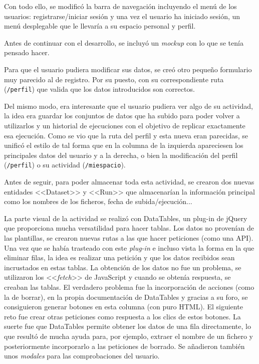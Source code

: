 Con todo ello, se modificó la barra de navegación incluyendo el menú de los
usuarios: registrarse/iniciar sesión y una vez el usuario ha iniciado sesión, un
menú desplegable que le llevaría a su espacio personal y perfil.

Antes de continuar con el desarrollo, se incluyó un \textit{mockup} con lo que
se tenía pensado hacer.

Para que el usuario pudiera modificar sus datos, se creó otro pequeño formulario
muy parecido al de registro. Por su puesto, con su correspondiente ruta
(\texttt{/perfil}) que valida que los datos introducidos son correctos.

Del mismo modo, era interesante que el usuario pudiera ver algo de su
actividad, la idea era guardar los conjuntos de datos que ha subido para poder
volver a utilizarlos y un historial de ejecuciones con el objetivo de replicar
exactamente esa ejecución. Como se vio que la ruta del perfil y esta nueva eran
parecidas, se unificó el estilo de tal forma que en la columna de la izquierda
apareciesen los principales datos del usuario y a la derecha, o bien la
modificación del perfil (\texttt{/perfil}) o su actividad (\texttt{/miespacio}).

Antes de seguir, para poder almacenar toda esta actividad, se crearon dos nuevas
entidades <<Dataset>> y <<Run>> que almacenarían la información principal como
los nombres de los ficheros, fecha de subida/ejecución...

La parte visual de la actividad se realizó con DataTables, un plug-in de jQuery
que proporciona mucha versatilidad para hacer tablas. Los datos no provenían de
las plantillas, se crearon nuevas rutas a las que hacer peticiones (como una
API). Una vez que se había trasteado con este \textit{plug-in} e incluso vista
la forma en la que eliminar filas, la idea es realizar una petición y que los
datos recibidos sean incrustados en estas tablas. La obtención de los datos no
fue un problema, se utilizaron los <<\textit{fetch}>> de JavaScript y cuando se
obtenía respuesta, se creaban las tablas. El verdadero problema fue la
incorporación de acciones (como la de borrar), en la propia documentación de
DataTables y gracias a su foro, se consiguieron generar botones en esta columna
(con puro HTML). El siguiente reto fue crear otras peticiones como respuesta a
los clics de estos botones. La suerte fue que DataTables permite obtener los
datos de una fila directamente, lo que resultó de mucha ayuda para, por ejemplo,
extraer el nombre de un fichero y posteriormente incorporarlo a las peticiones
de borrado. Se añadieron también unos \textit{modales} para las comprobaciones
del usuario.


